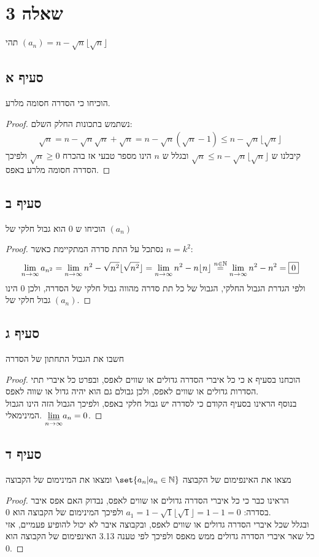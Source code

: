 \documentclass{article}
\DeclarePairedDelimiter\set\{\}
\begin{document}
	\pagebreak
	\section*{שאלה 3}
	תהי $(a_n) = n - \sqrt{n} \lfloor \sqrt{n} \rfloor$
	\subsection*{סעיף א}
	הוכיחו כי הסדרה חסומה מלרע.
	\begin{proof}
		נשתמש בתכונות החלק השלם:
		\begin{align*}
			\sqrt{n} =
			n - \sqrt{n} \sqrt{n} + \sqrt{n} =
			n - \sqrt{n} (\sqrt{n} - 1)
			\leq n - \sqrt{n} \lfloor \sqrt{n} \rfloor
		\end{align*}
		קיבלנו ש $\sqrt{n} \leq n - \sqrt{n} \lfloor \sqrt{n} \rfloor$ ובגלל ש $n$ הינו מספר טבעי אז בהכרח $\sqrt{n} \geq 0$ ולפיכך הסדרה חסומה מלרע באפס.
	\end{proof}

	\subsection*{סעיף ב}
	הוכיחו ש $0$ הוא גבול חלקי של $(a_n)$
	\begin{proof}
		נסתכל על התת סדרה המתקיימת כאשר $n = k^2$:
		\begin{align*}
			\lim_{n \to \infty} a_{n^2} = \lim_{n \to \infty} n^2 - \sqrt{n^2} \lfloor \sqrt{n^2} \rfloor =
			\lim_{n \to \infty} n^2 - n \lfloor n \rfloor \overset{n \in \mathbb{N}}=
			\lim_{n \to \infty} n^2 - n^2 = \boxed{0}
		\end{align*}
		ולפי הגדרת הגבול החלקי, הגבול של כל תת סדרה מהווה גבול חלקי של הסדרה, ולכן $0$ הינו גבול חלקי של $(a_n)$.
	\end{proof}

	\subsection*{סעיף ג}
	חשבו את הגבול התחתון של הסדרה
	\begin{proof}
		הוכחנו בסעיף א כי כל איברי הסדרה גדולים או שווים לאפס, ובפרט כל איברי תתי הסדרות גדולים או שווים לאפס, ולכן גבולם גם הוא יהיה גדול או שווה לאפס. \\
		בנוסף הראינו בסעיף הקודם כי לסדרה יש גבול חלקי באפס, ולפיכך הגבול הזה הינו הגבול המינימאלי.
		$\displaystyle{\varliminf_{n \to \infty}} a_n = 0$.
	\end{proof}

	\subsection*{סעיף ד}
	מצאו את האינפימום של הקבוצה $\set{a_n | a_n \in \NN}$ ומצאו את המינימום של הקבוצה
	\begin{proof}
		הראינו כבר כי כל איברי הסדרה גדולים או שווים לאפס, נבדוק האם אפס איבר בסדרה:
		$a_1 = 1 - \sqrt{1}\lfloor \sqrt{1} \rfloor = 1 - 1 = 0$
		ולפיכך המינימום של הקבוצה הוא 0. \\
		 ובגלל שכל איברי הסדרה גדולים או שווים לאפס, ובקבוצה איבר לא יכול להופיע פעמיים, אזי כל שאר איברי הסדרה גדולים ממש מאפס ולפיכך לפי טענה 3.13 האינפימום של הקבוצה הוא 0.
	\end{proof}
\end{document}
